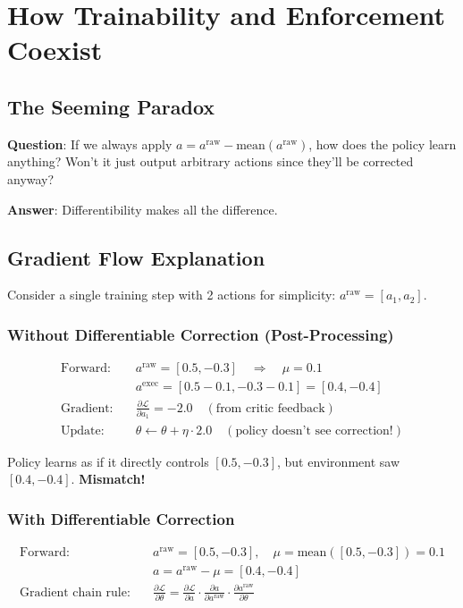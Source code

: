 \documentclass[11pt,a4paper]{article}
\theoremstyle{definition}
\begin{document}
\section{How Trainability and Enforcement Coexist}

\subsection{The Seeming Paradox}

\textbf{Question}: If we always apply $a = a^{\text{raw}} - \text{mean}(a^{\text{raw}})$, how does the policy learn anything? Won't it just output arbitrary actions since they'll be corrected anyway?

\textbf{Answer}: Differentibility makes all the difference.

\subsection{Gradient Flow Explanation}

Consider a single training step with 2 actions for simplicity: $a^{\text{raw}} = [a_1, a_2]$.

\subsubsection{Without Differentiable Correction (Post-Processing)}
\begin{align}
    \text{Forward:} \quad &a^{\text{raw}} = [0.5, -0.3] \quad \Rightarrow \quad \mu = 0.1 \\
    &a^{\text{exec}} = [0.5 - 0.1, -0.3 - 0.1] = [0.4, -0.4] \\
    \text{Gradient:} \quad &\frac{\partial \mathcal{L}}{\partial a_1} = -2.0 \quad (\text{from critic feedback}) \\
    \text{Update:} \quad &\theta \leftarrow \theta + \eta \cdot 2.0 \quad (\text{policy doesn't see correction!})
\end{align}

Policy learns as if it directly controls $[0.5, -0.3]$, but environment saw $[0.4, -0.4]$. \textbf{Mismatch!}

\subsubsection{With Differentiable Correction}
\begin{align}
    \text{Forward:} \quad &a^{\text{raw}} = [0.5, -0.3], \quad \mu = \text{mean}([0.5, -0.3]) = 0.1 \\
    &a = a^{\text{raw}} - \mu = [0.4, -0.4] \\
    \text{Gradient chain rule:} \quad &\frac{\partial \mathcal{L}}{\partial \theta} = \frac{\partial \mathcal{L}}{\partial a} \cdot \frac{\partial a}{\partial a^{\text{raw}}} \cdot \frac{\partial a^{\text{raw}}}{\partial \theta}
\end{align}
\end{document}
